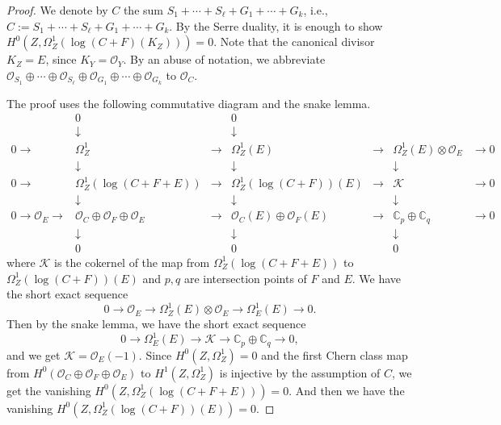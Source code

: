\documentclass[twoside,11pt]{amsart}
\begin{document}
\begin{proof} We denote by $C$ the sum $S_1+\cdots + S_\ell+G_1+\cdots+G_k$, i.e.,  $C:=
S_1+\cdots + S_\ell+G_1+\cdots+G_k.$ By the Serre duality, it is
enough to show $H^0(Z, \Omega_Z^1({\operatorname{log}} (C+F)(K_Z)))=0$. Note
that the canonical divisor $K_Z=E$, since $K_Y={{\mathcal O}}_Y$. By an
abuse of notation, we abbreviate ${{\mathcal O}}_{S_1}\oplus\cdots \oplus
{{\mathcal O}}_{S_\ell}\oplus{{\mathcal O}}_{G_1}\oplus\cdots\oplus{{\mathcal O}}_{G_k}$ to
${{\mathcal O}}_C$.

The proof uses the following commutative diagram and the snake
lemma.
\[\begin{array}{ccccccc}
& 0 & & 0& &  & \\
& \downarrow & & \downarrow & &  & \\
0\to & \Omega_Z^1 & \to & \Omega_Z^1(E) & \to &
\Omega_Z^1(E)\otimes{{\mathcal O}}_E &\to 0 \\
& \downarrow & & \downarrow & & \downarrow & \\
0\to & \Omega_Z^1({\operatorname{log}}(C+F+E)) & \to & \Omega_Z^1({\operatorname{log}}(C+F))(E) &
\to & {{\mathcal K}} &\to 0 \\
& \downarrow & & \downarrow & & \downarrow & \\
0\to{{\mathcal O}}_E\to & {{\mathcal O}}_C\oplus{{\mathcal O}}_F\oplus{{\mathcal O}}_E & \to &
{{\mathcal O}}_C(E)\oplus{{\mathcal O}}_F(E) & \to & {{\mathbb C}}_p\oplus{{\mathbb C}}_q &\to
0\\
& \downarrow & & \downarrow & & \downarrow & \\
& 0 & & 0& & 0 &
\end{array}\]
where ${{\mathcal K}}$ is the cokernel of the map from
$\Omega_Z^1({\operatorname{log}}(C+F+E))$ to $\Omega_Z^1({\operatorname{log}}(C+F))(E)$ and $p, q$
are intersection points of $F$ and $E$. We have the short exact
sequence
\[0\to {{\mathcal O}}_E\to \Omega_Z^1(E)\otimes{{\mathcal O}}_E \to \Omega_E^1(E)\to 0.\]
Then by the snake lemma, we have the short exact sequence
\[0\to \Omega_E^1(E)\to {{\mathcal K}}\to {{\mathbb C}}_p\oplus{{\mathbb C}}_q\to 0,\]
and we get ${{\mathcal K}}={{\mathcal O}}_E(-1)$. Since $H^0(Z, \Omega_Z^1)=0$ and the
first Chern class map from $H^0({{\mathcal O}}_C\oplus{{\mathcal O}}_F\oplus{{\mathcal O}}_E)$ to
$H^1(Z, \Omega_Z^1)$ is injective by the assumption of $C$, we get
the vanishing $H^0(Z, \Omega_Z^1({\operatorname{log}}(C+F+E)))=0$. And then we have
the vanishing $H^0(Z, \Omega_Z^1({\operatorname{log}}(C+F))(E))=0$.
\end{proof}
\end{document}
